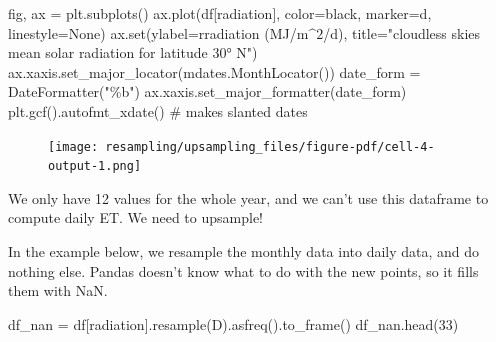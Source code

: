 \documentclass[
  letterpaper,
  DIV=11,
  numbers=noendperiod,
  oneside]{scrreprt}
\newenvironment{Shaded}{\begin{snugshade}}{\end{snugshade}}
\newcommand{\BuiltInTok}[1]{\textcolor[rgb]{0.00,0.23,0.31}{#1}}
\newcommand{\CommentTok}[1]{\textcolor[rgb]{0.37,0.37,0.37}{#1}}
\newcommand{\DecValTok}[1]{\textcolor[rgb]{0.68,0.00,0.00}{#1}}
\newcommand{\NormalTok}[1]{\textcolor[rgb]{0.00,0.23,0.31}{#1}}
\newcommand{\OperatorTok}[1]{\textcolor[rgb]{0.37,0.37,0.37}{#1}}
\newcommand{\StringTok}[1]{\textcolor[rgb]{0.13,0.47,0.30}{#1}}
\newcommand{\VerbatimStringTok}[1]{\textcolor[rgb]{0.13,0.47,0.30}{#1}}
\begin{document}
\begin{Shaded}
\begin{Highlighting}[]
\NormalTok{fig, ax }\OperatorTok{=}\NormalTok{ plt.subplots()}
\NormalTok{ax.plot(df[}\StringTok{\textquotesingle{}radiation\textquotesingle{}}\NormalTok{], color}\OperatorTok{=}\StringTok{\textquotesingle{}black\textquotesingle{}}\NormalTok{, marker}\OperatorTok{=}\StringTok{\textquotesingle{}d\textquotesingle{}}\NormalTok{, linestyle}\OperatorTok{=}\StringTok{\textquotesingle{}None\textquotesingle{}}\NormalTok{)}
\NormalTok{ax.}\BuiltInTok{set}\NormalTok{(ylabel}\OperatorTok{=}\VerbatimStringTok{r\textquotesingle{}radiation (MJ/m$\^{}2$/d)\textquotesingle{}}\NormalTok{,}
\NormalTok{       title}\OperatorTok{=}\StringTok{"cloudless skies mean solar radiation for latitude 30° N"}\NormalTok{)}
\NormalTok{ax.xaxis.set\_major\_locator(mdates.MonthLocator())}
\NormalTok{date\_form }\OperatorTok{=}\NormalTok{ DateFormatter(}\StringTok{"\%b"}\NormalTok{)}
\NormalTok{ax.xaxis.set\_major\_formatter(date\_form)}
\NormalTok{plt.gcf().autofmt\_xdate()  }\CommentTok{\# makes slanted dates}
\end{Highlighting}
\end{Shaded}

\begin{figure}[H]

{\centering \texttt{[image: resampling/upsampling\_files/figure-pdf/cell-4-output-1.png]}

}

\end{figure}

We only have 12 values for the whole year, and we can't use this
dataframe to compute daily ET. We need to upsample!

In the example below, we resample the monthly data into daily data, and
do nothing else. Pandas doesn't know what to do with the new points, so
it fills them with NaN.

\begin{Shaded}
\begin{Highlighting}[]
\NormalTok{df\_nan }\OperatorTok{=}\NormalTok{ df[}\StringTok{\textquotesingle{}radiation\textquotesingle{}}\NormalTok{].resample(}\StringTok{\textquotesingle{}D\textquotesingle{}}\NormalTok{).asfreq().to\_frame()}
\NormalTok{df\_nan.head(}\DecValTok{33}\NormalTok{)}
\end{Highlighting}
\end{Shaded}
\end{document}
